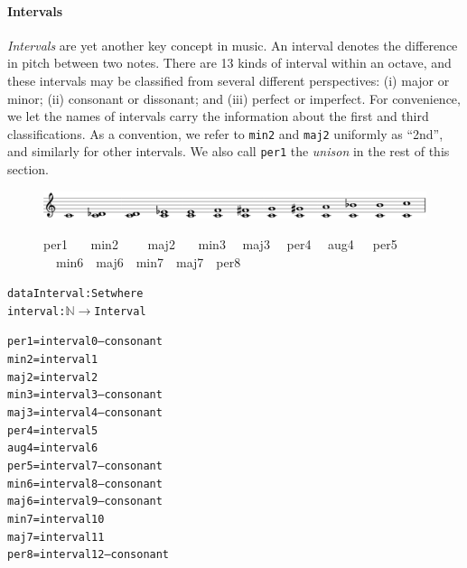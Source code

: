 \paragraph{Intervals}

\emph{Intervals} are yet another key concept in music.
An interval denotes the difference in pitch between two notes.
There are 13 kinds of interval within an octave, and these intervals
may be classified from several different perspectives: (i) major or minor;
(ii) consonant or dissonant; and (iii) perfect or imperfect.
For convenience, we let the names of intervals carry the information
about the first and third classifications.
As a convention, we refer to \texttt{min2} and \texttt{maj2}  uniformly
as ``2nd'', and similarly for other intervals.
We also call \texttt{per1} the \emph{unison} in the rest of this section.

\begin{figure}[h]
  \includegraphics[width=12cm]{fig/interval.png} \\
  \begin{flushleft}
    \begin{small}
      \hspace{1.45cm} per1 \ \ \ min2 \ \ \ \ maj2 \ \ \ min3 \ \ maj3
      \ \ per4 \ \ aug4 \ \ \,per5 \ \ min6 \ \,maj6 \ \,min7 \ \,maj7 \ \,per8
    \end{small}
  \end{flushleft}
\end{figure}
  
\begin{alltt}
data Interval : Set where
interval : \(\mathbb{N}\) \(\rightarrow\) Interval

per1  = interval 0 -- consonant
min2  = interval 1
maj2  = interval 2
min3  = interval 3 -- consonant
maj3  = interval 4 -- consonant
per4  = interval 5 
aug4  = interval 6
per5  = interval 7 -- consonant
min6  = interval 8 -- consonant
maj6  = interval 9 -- consonant
min7  = interval 10
maj7  = interval 11
per8  = interval 12 -- consonant
\end{alltt}
